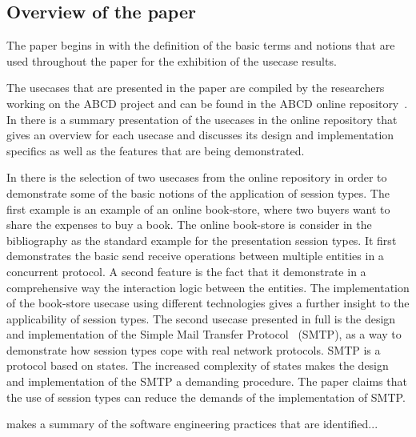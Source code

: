 \subsection{Overview of the paper}

The paper begins in 
with the definition of the basic terms and notions
that are used throughout the paper for the exhibition of the usecase
results.

The usecases that are presented in the paper are compiled by the researchers
working on the ABCD project and can be found in the ABCD online repository~\cite{usecase_repository}.
In  there is a summary presentation
of the usecases in the online repository that gives an overview
for each usecase and discusses its design and implementation specifics
as well as the features that are being demonstrated.

In  there is the selection of two
usecases from the online repository in order to demonstrate
some of the basic notions of the application of session types.
The first example is an example of an online book-store,
where two buyers want to share the expenses to buy a book.
The online book-store is consider in the bibliography as the
standard example for the presentation session types.
It first demonstrates the basic send receive operations
between multiple entities in a concurrent protocol. A second
feature is the fact that it demonstrate in a comprehensive
way the interaction logic between the entities.
The implementation of the book-store usecase using different
technologies gives a further insight to the applicability of
session types.
The second usecase presented in full is the design and implementation
of the Simple Mail Transfer Protocol~\cite{citation_needed} (SMTP),
as a way to demonstrate how session types cope with real network
protocols. SMTP is a protocol based on states. The increased complexity
of states makes the design and implementation of the SMTP a demanding
procedure. The paper claims that the use of session types can reduce
the demands of the implementation of SMTP.

 makes a summary of the software engineering
practices that are identified... 



